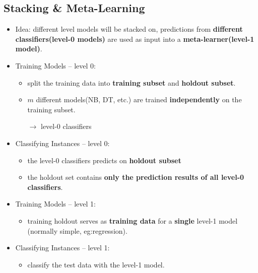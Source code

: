 \subsection{Stacking \& Meta-Learning}
\begin{itemize}
	\item Idea: different level models will be stacked on, predictions from \textbf{different classifiers(level-0 models)} are used as input into a \textbf{meta-learner(level-1 model)}. 
	\item Training Models -- level 0:
	\begin{itemize}
		\item split the training data into \textbf{training subset} and \textbf{holdout subset}.
		\item $m$ different models(NB, DT, etc.) are trained \textbf{independently} on the training subset. 
		
		$\rightarrow$ level-0 classifiers
	\end{itemize}
	\item Classifying Instances -- level 0:
	\begin{itemize}
		\item the level-0 classifiers predicts on \textbf{holdout subset}
		\item the holdout set contains \textbf{only the prediction results of all level-0 classifiers}.
	\end{itemize}
	\item Training Models -- level 1:
	\begin{itemize}
		\item training holdout serves as \textbf{training data} for a \textbf{single} level-1 model (normally simple, eg:regression).
	\end{itemize}
	\item Classifying Instances -- level 1:
	\begin{itemize}
		\item classify the test data with the level-1 model.
	\end{itemize}
\end{itemize}